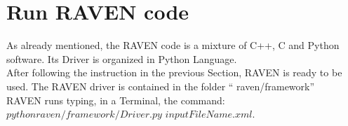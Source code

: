 \section{Run RAVEN code  \\ \vspace{2 mm} {\small }}
As already mentioned, the RAVEN code is a mixture of C++, C and Python software. Its Driver is organized in Python Language.
\\ After following the instruction in the previous Section, RAVEN is ready to be used. The RAVEN driver is contained in the folder `` raven/framework''
\\ RAVEN runs typing, in a Terminal, the command:
\\ $python raven/framework/Driver.py$ $ inputFileName.xml$.
